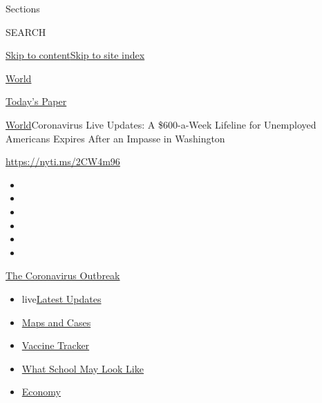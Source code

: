 Sections

SEARCH

\protect\hyperlink{site-content}{Skip to
content}\protect\hyperlink{site-index}{Skip to site index}

\href{https://www.nytimes.com/section/world}{World}

\href{https://myaccount.nytimes.com/auth/login?response_type=cookie\&client_id=vi}{}

\href{https://www.nytimes.com/section/todayspaper}{Today's Paper}

\href{/section/world}{World}\textbar{}Coronavirus Live Updates: A
\$600-a-Week Lifeline for Unemployed Americans Expires After an Impasse
in Washington

\url{https://nyti.ms/2CW4m96}

\begin{itemize}
\item
\item
\item
\item
\item
\item
\end{itemize}

\href{https://www.nytimes.com/news-event/coronavirus?action=click\&pgtype=Article\&state=default\&region=TOP_BANNER\&context=storylines_menu}{The
Coronavirus Outbreak}

\begin{itemize}
\tightlist
\item
  live\href{https://www.nytimes.com/2020/07/31/world/coronavirus-covid-19.html?action=click\&pgtype=Article\&state=default\&region=TOP_BANNER\&context=storylines_menu}{Latest
  Updates}
\item
  \href{https://www.nytimes.com/interactive/2020/us/coronavirus-us-cases.html?action=click\&pgtype=Article\&state=default\&region=TOP_BANNER\&context=storylines_menu}{Maps
  and Cases}
\item
  \href{https://www.nytimes.com/interactive/2020/science/coronavirus-vaccine-tracker.html?action=click\&pgtype=Article\&state=default\&region=TOP_BANNER\&context=storylines_menu}{Vaccine
  Tracker}
\item
  \href{https://www.nytimes.com/interactive/2020/07/29/us/schools-reopening-coronavirus.html?action=click\&pgtype=Article\&state=default\&region=TOP_BANNER\&context=storylines_menu}{What
  School May Look Like}
\item
  \href{https://www.nytimes.com/live/2020/07/31/business/stock-market-today-coronavirus?action=click\&pgtype=Article\&state=default\&region=TOP_BANNER\&context=storylines_menu}{Economy}
\end{itemize}

